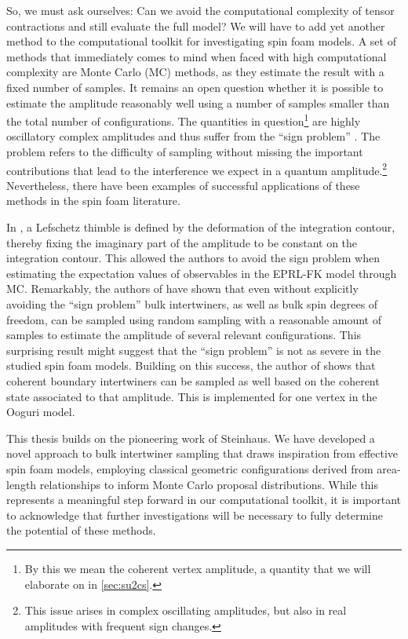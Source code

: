 So, we must ask ourselves: Can we avoid the computational complexity of tensor
contractions and still evaluate the full model? We will have to add yet another
method to the computational toolkit for investigating spin foam models. A set
of methods that immediately comes to mind when faced with high computational
complexity are Monte Carlo (MC) methods, as they estimate the result with a
fixed number of samples. It remains an open question whether it is possible to
estimate the amplitude reasonably well using a number of samples smaller than
the total number of configurations. The quantities in question\footnote{By this
we mean the coherent vertex amplitude, a quantity that we will elaborate on in
\cref*{sec:su2cs}.} are highly oscillatory complex amplitudes and thus suffer
from the ``sign problem'' \cite{panSignProblemQuantum2024}. The problem refers
to the difficulty of sampling without missing the important contributions that
lead to the interference we expect in a quantum amplitude.\footnote{This issue
arises in complex oscillating amplitudes, but also in real amplitudes with
frequent sign changes.} Nevertheless, there have been examples of successful
applications of these methods in the spin foam literature.

In \cite{hanSpinfoamLefschetzThimble2021}, a Lefschetz thimble is defined by
the deformation of the integration contour, thereby fixing the imaginary part
of the amplitude to be constant on the integration contour. This allowed the
authors to avoid the sign problem when estimating the expectation values of
observables in the EPRL-FK model through MC. Remarkably, the authors of
\cite{donaSummingBulkQuantum2023} have shown that even without explicitly
avoiding the ``sign problem'' bulk intertwiners, as well as bulk spin degrees
of freedom, can be sampled using random sampling with a reasonable amount of
samples to estimate the amplitude of several relevant configurations. This
surprising result might suggest that the ``sign problem'' is not as severe in
the studied spin foam models. Building on this success, the author of
\cite{steinhausMonteCarloAlgorithm2024} shows that coherent boundary
intertwiners can be sampled as well based on the coherent state associated to
that amplitude. This is implemented for one vertex in the Ooguri model. 

This thesis builds on the pioneering work of Steinhaus. We have developed a
novel approach to bulk intertwiner sampling that draws inspiration from
effective spin foam models, employing classical geometric configurations
derived from area-length relationships to inform Monte Carlo proposal
distributions. While this represents a meaningful step forward in our
computational toolkit, it is important to acknowledge that further
investigations will be necessary to fully determine the potential of these
methods.  

